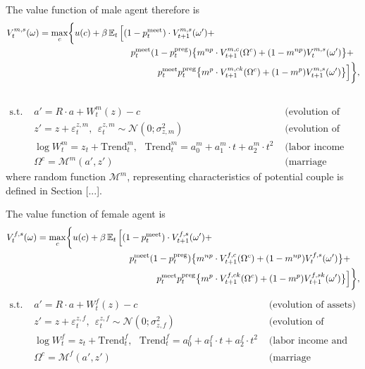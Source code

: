 The value function of male agent therefore is
\begin{align}V^{m,s}_t(\omega) = \max\limits_{c} & \bigg\{ u(c) + \beta \E_t \Big[ (1 - p^{\text{meet}}_t)\cdot V^{m,s}_{t+1}(\omega') + \\ \nonumber
& \hspace{7em} p^{\text{meet}}_t (1-p^{\text{preg}}_t) \big\{ m^{np} \cdot V^{m,c}_{t+1}(\Omega^c) + (1-m^{np})V^{m,s}_t(\omega')\big\} + \\  \nonumber
& \hspace{10em} p^{\text{meet}}_t p^{\text{preg}}_t \big\{ m^{p} \cdot V^{m,ck}_{t+1}(\Omega^c) + (1-m^{p})V^{m,s}_{t+1}(\omega')\big\}  \Big]  \bigg\},\\  \nonumber
 \end{align}\vspace{-3em}
 \begin{align*}
 \text{s.t. \ }  &  a' = R\cdot a  + W^m_t(z) - c  & \text{ (evolution of assets)}\\
 &  z' = z + \varepsilon^{z,m}_t, \ \ \varepsilon^{z,m}_t \sim \mathcal{N}(0;\sigma_{z,m}^2) &  \text{ (evolution of productivity)}\\
  & \log W^m_t = z_t + \text{Trend}^m_t, \ \ \  \text{Trend}^m_t = a^m_0 + a^m_1\cdot t  +  a^m_2 \cdot t^2 &  \text{ (labor income and trend)}\\
  & \Omega^c = \mathcal{M}^m(a',z') &  \text{ (marriage prospectives)}
\end{align*}
where random function $\mathcal{M}^m$, representing characteristics of potential couple is defined in Section [...].

The value function of female agent is
\begin{align}V^{f,s}_t(\omega) = \max\limits_{c} & \bigg\{ u(c) + \beta \E_t \Big[ (1 - p^{\text{meet}}_t)\cdot V^{f,s}_{t+1}(\omega') + \label{single-fem} \\  \nonumber
& \hspace{7em} p^{\text{meet}}_t (1-p^{\text{preg}}_t) \big\{ m^{np} \cdot V^{f,c}_{t+1}(\Omega^c) + (1-m^{np})V^{f,s}_t(\omega')\big\} + \\  \nonumber
& \hspace{10em} p^{\text{meet}}_t p^{\text{preg}}_t \big\{ m^{p} \cdot V^{f,ck}_{t+1}(\Omega^c) + (1-m^{p})V^{f,sk}_{t+1}(\omega')\big\}  \Big]  \bigg\},
\end{align}\vspace{-3em}
\begin{align*}
 \text{s.t. \ }  &  a' = R\cdot a  + W^f_t(z) - c  & \text{ (evolution of assets)}\\
 &  z' = z + \varepsilon^{z,f}_t, \ \ \varepsilon^{z,f}_t \sim \mathcal{N}(0;\sigma_{z,f}^2) &  \text{ (evolution of productivity)}\\
  & \log W^f_t = z_t + \text{Trend}^f_t, \ \ \  \text{Trend}^f_t = a^f_0 + a^f_1\cdot t  +  a^f_2 \cdot t^2 &  \text{ (labor income and trend)}\\
  & \Omega^c = \mathcal{M}^f(a',z') &  \text{ (marriage prospectives)}
\end{align*}

